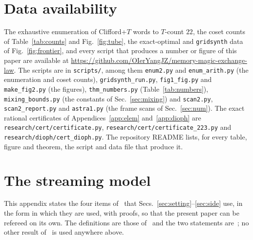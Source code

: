 \documentclass[aps,prx,twocolumn,superscriptaddress,nofootinbib,longbibliography]{revtex4-2}
\theoremstyle{plain}
\theoremstyle{definition}
\theoremstyle{remark}
\begin{document}
\section*{Data availability}
{\raggedright
The exhaustive enumeration of Clifford+$T$ words to $T$-count $22$, the coset counts of Table~\ref{tab:counts} and Fig.~\ref{fig:tube}, the exact-optimal and \texttt{gridsynth} data of Fig.~\ref{fig:frontier}, and every script that produces a number or figure of this paper are available at \url{https://github.com/OIerYangJZ/memory-magic-exchange-law}. The scripts are in \texttt{scripts/}, among them \texttt{enum2.py} and \texttt{enum\_arith.py} (the enumeration and coset counts), \texttt{gridsynth\_run.py}, \texttt{fig1\_fig.py} and \texttt{make\_fig2.py} (the figures), \texttt{thm\_numbers.py} (Table~\ref{tab:numbers}), \texttt{mixing\_bounds.py} (the constants of Sec.~\ref{sec:mixing}) and \texttt{scan2.py}, \texttt{scan2\_report.py} and \texttt{astra1.py} (the frame scans of Sec.~\ref{sec:num}). The exact rational certificates of Appendices~\ref{app:elem} and~\ref{app:dioph} are \texttt{research/cert/certificate.py}, \texttt{research/cert/certificate\_223.py} and \texttt{research/dioph/cert\_dioph.py}. The repository README lists, for every table, figure and theorem, the script and data file that produce it.\par}

\appendix

\section{The streaming model}\label{app:model}

This appendix states the four items of~\cite{Paper1} that Secs.~\ref{sec:setting}--\ref{sec:side} use, in the form in which they are used, with proofs, so that the present paper can be refereed on its own. The definitions are those of~\cite[Def.~9, 13, 20, 21]{Paper1} and the two statements are~\cite[Lem.~1, Prop.~10]{Paper1}; no other result of~\cite{Paper1} is used anywhere above.
\end{document}
